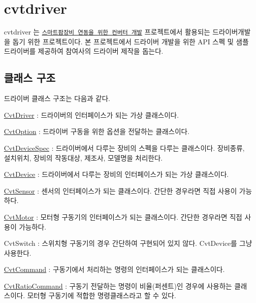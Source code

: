 \section*{cvtdriver}

cvtdriver 는 \href{https://github.com/ebio-snu/stdcvt}{\tt 스마트팜장비 연동을 위한 컨버터 개발} 프로젝트에서 활용되는 드라이버개발을 돕기 위한 프로젝트이다. 본 프로젝트에서 드라이버 개발을 위한 A\+PI 스펙 및 샘플 드라이버를 제공하여 참여사의 드라이버 제작을 돕는다.

\subsection*{클래스 구조}

드라이버 클래스 구조는 다음과 같다.




\begin{DoxyItemize}
\item \hyperlink{classstdcvt_1_1CvtDriver}{Cvt\+Driver} \+: 드라이버의 인터페이스가 되는 가상 클래스이다.
\item \hyperlink{classstdcvt_1_1CvtOption}{Cvt\+Option} \+: 드라이버 구동을 위한 옵션을 전달하는 클래스이다.
\item \hyperlink{classstdcvt_1_1CvtDeviceSpec}{Cvt\+Device\+Spec} \+: 드라이버에서 다루는 장비의 스펙을 다루는 클래스이다. 장비종류, 설치위치, 장비의 작동대상, 제조사, 모델명을 처리한다.
\item \hyperlink{classstdcvt_1_1CvtDevice}{Cvt\+Device} \+: 드라이버에서 다루는 장비의 인터페이스가 되는 가상 클래스이다.
\begin{DoxyItemize}
\item \hyperlink{classstdcvt_1_1CvtSensor}{Cvt\+Sensor} \+: 센서의 인터페이스가 되는 클래스이다. 간단한 경우라면 직접 사용이 가능하다.
\item \hyperlink{classstdcvt_1_1CvtMotor}{Cvt\+Motor} \+: 모터형 구동기의 인터페이스가 되는 클래스이다. 간단한 경우라면 직접 사용이 가능하다.
\item Cvt\+Switch \+: 스위치형 구동기의 경우 간단하여 구현되어 있지 않다. Cvt\+Device를 그냥 사용한다.
\end{DoxyItemize}
\item \hyperlink{classstdcvt_1_1CvtCommand}{Cvt\+Command} \+: 구동기에서 처리하는 명령의 인터페이스가 되는 클래스이다.
\begin{DoxyItemize}
\item \hyperlink{classstdcvt_1_1CvtRatioCommand}{Cvt\+Ratio\+Command} \+: 구동기 전달하는 명령이 비율(퍼센트)인 경우에 사용하는 클래스이다. 모터형 구동기에 적합한 명령클래스라고 할 수 있다.
\end{DoxyItemize}
\end{DoxyItemize}

